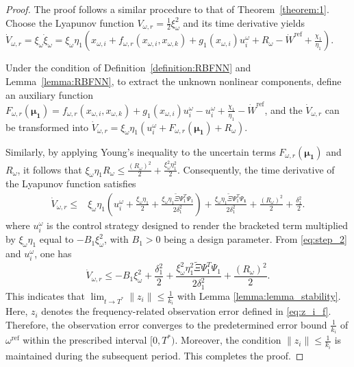 \documentclass[]{interact}
\theoremstyle{plain}%
\theoremstyle{definition}
\theoremstyle{remark}
\begin{document}
\begin{proof}
The proof follows a similar procedure to that of Theorem~\ref{theorem:1}. Choose the Lyapunov function $V_{\omega,r} = \frac{1}{2}\xi_\omega^2$ and its time derivative yields $\dot{V}_{\omega,r} = \xi_\omega \dot{\xi}_\omega = \xi_\omega \eta_1 ( x_{\omega,i} + f_{\omega,r}(x_{\omega,i}, x_{\omega,k}) + g_1(x_{\omega,i}) u_i^\omega + R_\omega - \dot{W}^{\text{ref}} + \frac{\chi_1}{\eta_1} )$.

Under the condition of Definition~\ref{definition:RBFNN} and Lemma~\ref{lemma:RBFNN}, to extract the unknown nonlinear components, define an auxiliary function $F_{\omega,r}(\boldsymbol{\mu_1})
= f_{\omega,r}(x_{\omega,i},x_{\omega,k})
  + g_1(x_{\omega,i})u_i^\omega - u_i^\omega
  + \frac{\chi_1}{\eta_1}
  - \dot{W}^{\text{ref}}$, and the $\dot{V}_{\omega,r}$ can be transformed into $\dot{V}_{\omega,r}
= \xi_\omega \eta_1 \left(
    u_i^\omega + F_{\omega,r}(\boldsymbol{\mu_1}) + R_\omega
\right).$


Similarly, by applying Young's inequality to the uncertain terms
$F_{\omega,r}(\boldsymbol{\mu_1})$ and $R_\omega$, it follows that $\xi_\omega \eta_1 R_\omega
\le \frac{(R_\omega)^2}{2}
+ \frac{\xi_\omega^2 \eta_1^2}{2}$. Consequently, the time derivative of the Lyapunov function satisfies
\begin{equation}
\label{eq:step_2}
\begin{aligned}
\dot{V}_{\omega,r}
\le {} & \xi_\omega \eta_1
\left(
u_i^\omega
+ \frac{\xi_\omega \eta_1}{2}
+ \frac{\xi_\omega \eta_1 \tilde{\Xi} \boldsymbol{\varPsi}_1^{T} \boldsymbol{\varPsi}_1}{2\delta_1^{2}}
\right) + \frac{\xi_\omega \eta_1 \tilde{\Xi} \boldsymbol{\varPsi}_1^{T} \boldsymbol{\varPsi_1}}{2\delta_1^{2}}
+ \frac{(R_\omega)^{2}}{2}
+ \frac{\delta_1^{2}}{2}.
\end{aligned}
\end{equation}
where $u_i^\omega$ is the control strategy designed to render the bracketed term multiplied by $\xi_\omega \eta_1$ equal to $-B_1 \xi_\omega^{2}$, with $B_1>0$ being a design parameter. 
From \eqref{eq:step_2} and $u_i^\omega$, one has %
\begin{equation}
\label{eq:L_F}
\dot{V}_{\omega,r}
 \le -B_1 \xi_\omega^2
     + \frac{\delta_1^2}{2}
     + \frac{\xi_\omega^2 \eta_1^2 \tilde{\Xi}\boldsymbol{\varPsi}_1^T\boldsymbol{\varPsi}_1}{2\delta_1^2}
     + \frac{(R_\omega)^2}{2}.
\end{equation}
This indicates that $\lim_{t \rightarrow T^*} \| z_i \| \le \frac{1}{k_i}$ with Lemma \ref{lemma:lemma_stability}. Here, $z_i$ denotes the frequency-related observation error defined in \eqref{eq:z_i_f}. Therefore, the observation error converges to the predetermined error bound $\frac{1}{k_i}$ of $\omega^{\text{ref}}$ within the prescribed interval $[0, T^*)$. Moreover, the condition $\| z_i \| \le \frac{1}{k_i}$ is maintained during the subsequent period. This completes the proof.
\end{proof}
\end{document}
